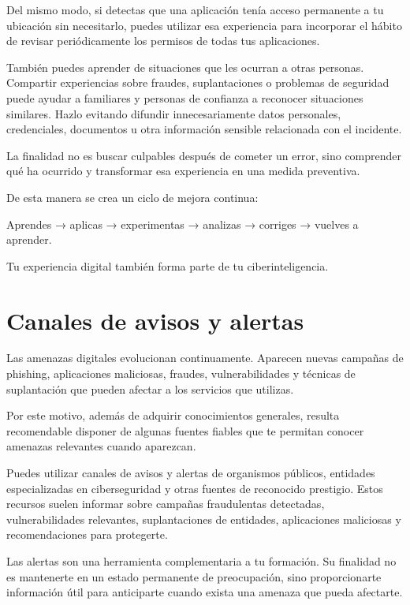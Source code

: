 \documentclass[
  spanish,
  a4paper,
  openany]{book}
\begin{document}
Del mismo modo, si detectas que una aplicación tenía acceso permanente a tu ubicación sin necesitarlo, puedes utilizar esa experiencia para incorporar el hábito de revisar periódicamente los permisos de todas tus aplicaciones.

También puedes aprender de situaciones que les ocurran a otras personas. Compartir experiencias sobre fraudes, suplantaciones o problemas de seguridad puede ayudar a familiares y personas de confianza a reconocer situaciones similares. Hazlo evitando difundir innecesariamente datos personales, credenciales, documentos u otra información sensible relacionada con el incidente.

La finalidad no es buscar culpables después de cometer un error, sino comprender qué ha ocurrido y transformar esa experiencia en una medida preventiva.

De esta manera se crea un ciclo de mejora continua:

Aprendes → aplicas → experimentas → analizas → corriges → vuelves a aprender.

Tu experiencia digital también forma parte de tu ciberinteligencia.

\section{Canales de avisos y alertas}\label{canales-de-avisos-y-alertas}

Las amenazas digitales evolucionan continuamente. Aparecen nuevas campañas de phishing, aplicaciones maliciosas, fraudes, vulnerabilidades y técnicas de suplantación que pueden afectar a los servicios que utilizas.

Por este motivo, además de adquirir conocimientos generales, resulta recomendable disponer de algunas fuentes fiables que te permitan conocer amenazas relevantes cuando aparezcan.

Puedes utilizar canales de avisos y alertas de organismos públicos, entidades especializadas en ciberseguridad y otras fuentes de reconocido prestigio. Estos recursos suelen informar sobre campañas fraudulentas detectadas, vulnerabilidades relevantes, suplantaciones de entidades, aplicaciones maliciosas y recomendaciones para protegerte.

Las alertas son una herramienta complementaria a tu formación. Su finalidad no es mantenerte en un estado permanente de preocupación, sino proporcionarte información útil para anticiparte cuando exista una amenaza que pueda afectarte.
\end{document}
